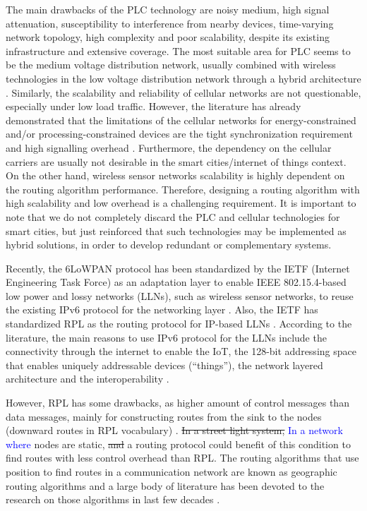 \documentclass[final,authoryear,3p,twocolumn]{elsarticle}
\newcommand{\removed}{\sout}
\newcommand{\rev}{\textcolor{blue}}
\begin{document}
The main drawbacks of the PLC technology are noisy medium, high signal attenuation, susceptibility to interference from nearby devices, time-varying network topology, high complexity and poor scalability, despite its existing infrastructure and extensive coverage. The most suitable area for PLC seems to be the medium voltage distribution network, usually combined with wireless technologies in the low voltage distribution network through a hybrid architecture \citep{PLC_drawbacks}. Similarly, the scalability and reliability of cellular networks are not questionable, especially under low load traffic. However, the literature has already demonstrated that the limitations of the cellular networks for energy-constrained and/or processing-constrained devices are the tight synchronization requirement and high signalling overhead \citep{celullar_iot}. Furthermore, the dependency on the cellular carriers are usually not desirable in the smart cities/internet of things context. On the other hand, wireless sensor networks scalability is highly dependent on the routing algorithm performance. Therefore, designing a routing algorithm with high scalability and low overhead is a challenging requirement. It is important to note that we do not completely discard the PLC and cellular technologies for smart cities, but just reinforced that such technologies may be implemented as hybrid solutions, in order to develop redundant or complementary systems.

Recently, the 6LoWPAN protocol has been standardized by the IETF (Internet Engineering Task Force) as an adaptation layer to enable IEEE 802.15.4-based low power and lossy networks (LLNs), such as wireless sensor networks, to reuse the existing IPv6 protocol for the networking layer \citep{RFC4944}. Also, the IETF has standardized RPL as the routing protocol for IP-based LLNs \citep{RFC6550}. According to the literature, the main reasons to use IPv6 protocol for the LLNs include the connectivity through the internet to enable the IoT, the 128-bit addressing space that enables uniquely addressable devices (``things''), the network layered architecture and the interoperability \citep{IPv6_LLN_2010, IPv6_LLN_2011, Smart_City_IOT_2014b}.

However, RPL has some drawbacks, as higher amount of control messages than data messages, mainly for constructing routes from the sink to the nodes (downward routes in RPL vocabulary) \citep{Heurtefeux_RPL_2013,P2P_analysis_2010,P2P-RPL_2011}. \removed{In a street light system,} \rev{In a network where} nodes are static, \removed{and} a routing protocol could benefit of this condition to find routes with less control overhead than RPL. The routing algorithms that use position to find routes in a communication network are known as geographic routing algorithms and a large body of literature has been devoted to the research on those algorithms in last few decades \citep{Karp_GPSR_2000, Position_Based_Routing_Ad_Hoc_2001, On_Optimal_Geographic_Routing_2007, Denardin2011}.
\end{document}
